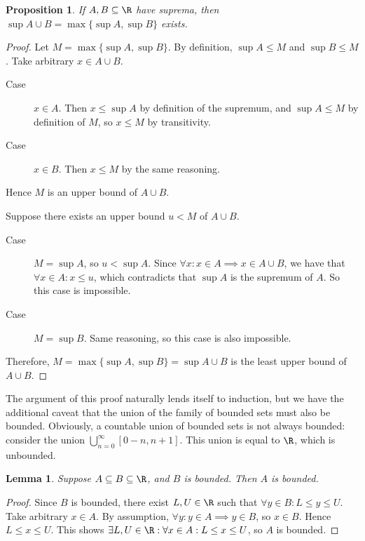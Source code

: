 \documentclass[letterpaper,11pt]{article}
\newtheorem{prop}{Proposition}
\newtheorem{lem}{Lemma}
\newcommand{\union}{\cup}
\newcommand{\Union}{\bigcup}
\begin{document}
\begin{prop}
  If $A, B \subseteq \R$ have suprema,
  then $\sup{A \union B} = \max\{\sup A, \sup B\}$
  exists.
\end{prop}

\begin{proof}
  Let $M = \max \{ \sup A, \sup B \}$.
  By definition, $\sup A \leq M$
  and $\sup B \leq M$.
  Take arbitrary $x \in A \union B$.
  \begin{description}
    \item[Case] $x \in A$.
      Then $x \leq \sup A$ by definition of the supremum,
      and $\sup A \leq M$ by definition of $M$,
      so $x \leq M$ by transitivity.
    \item[Case] $x \in B$. Then $x \leq M$ by the same reasoning.
  \end{description}
  Hence $M$ is an upper bound of $A \union B$.

  Suppose there exists an upper bound $u < M$ of $A \union B$.
  \begin{description}
    \item[Case] $M = \sup A$, so $u < \sup A$.
      Since $\forall x: x \in A \implies x \in A \union B$,
      we have that $\forall x \in A: x \leq u$, which contradicts that $\sup A$
      is the supremum of $A$.
      So this case is impossible.
    \item[Case] $M = \sup B$. Same reasoning, so this case is also impossible.
  \end{description}

  Therefore, $M = \max \{ \sup A, \sup B \} = \sup A \union B$ is the least
  upper bound of $A \union B$.
\end{proof}

The argument of this proof naturally lends itself to induction, but we have the
additional caveat that the union of the family of bounded sets must also be
bounded.  Obviously, a countable union of bounded sets is not always bounded:
consider the union $\Union_{n=0}^\infty [0-n, n+1]$. This union is equal to
$\R$, which is unbounded.

\begin{lem}
  Suppose $A \subseteq B \subseteq \R$, and $B$ is bounded. Then $A$ is
  bounded.
\end{lem}

\begin{proof}
  Since $B$ is bounded, there exist $L, U \in \R$ such that
  $\forall y \in B: L \leq y \leq U$.
  Take arbitrary $x \in A$.
  By assumption, $\forall y: y \in A \implies y \in B$, so $x \in B$.
  Hence $L \leq x \leq U$.
  This shows $\exists L, U \in \R: \forall x \in A: L \leq x \leq U$,
  so $A$ is bounded.
\end{proof}
\end{document}

